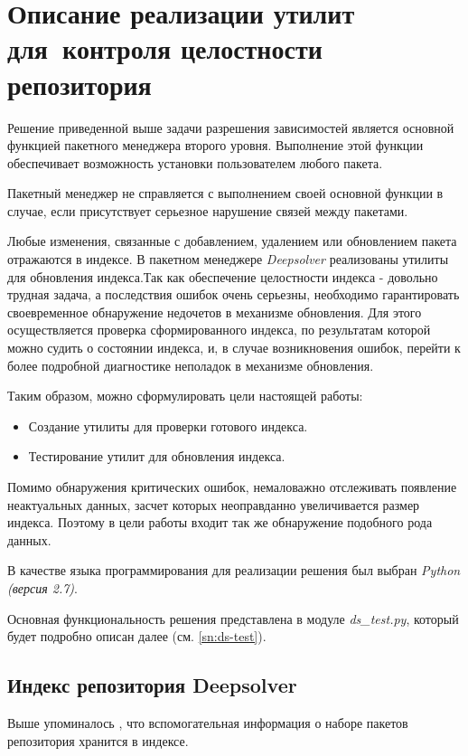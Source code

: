 \section{Описание реализации утилит для~контроля целостности репозитория}
Решение приведенной выше задачи разрешения зависимостей является основной
функцией пакетного менеджера второго уровня. Выполнение этой функции обеспечивает
возможность установки пользователем любого пакета.

Пакетный менеджер не справляется с выполнением своей основной функции в случае,
если присутствует серьезное нарушение связей между пакетами. 

Любые изменения, связанные с добавлением, удалением или обновлением пакета отражаются в индексе.
В пакетном менеджере \textit{Deepsolver} реализованы утилиты для обновления индекса.Так как обеспечение целостности индекса - довольно трудная задача, а 
последствия ошибок очень серьезны, необходимо гарантировать своевременное
обнаружение недочетов в механизме обновления. Для этого осуществляется
проверка сформированного индекса, по результатам которой можно
судить о состоянии индекса, и, в случае возникновения ошибок, перейти
к более подробной диагностике неполадок в механизме обновления. 

Таким образом, можно сформулировать цели настоящей работы:
\begin{itemize}
\item{Создание утилиты для проверки готового индекса.}
\item{Тестирование утилит для обновления индекса.}
\end{itemize}

Помимо обнаружения критических ошибок, немаловажно отслеживать 
появление неактуальных данных, засчет которых неоправданно 
увеличивается размер индекса. Поэтому в цели работы входит
так же обнаружение подобного рода данных.

В качестве языка программирования для реализации решения был выбран \textit{Python (версия 2.7)}.

Основная функциональность решения представлена в модуле \textit{ds\_test.py}, который
будет подробно описан далее (см. \ref{sn:ds-test}).%

\subsection{Индекс репозитория Deepsolver}
Выше упоминалось , что вспомогательная информация о наборе пакетов репозитория
хранится в индексе. 

